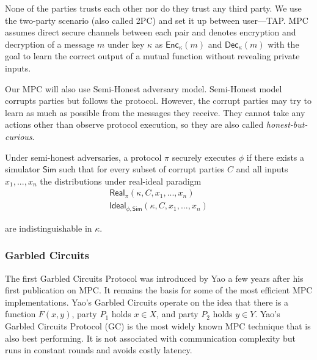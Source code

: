 None of the parties trusts each other nor do they trust any third party. We use the two-party scenario
(also called 2PC) and set it up between user---TAP. MPC assumes direct secure channels between each
pair and denotes encryption and decryption of a message $m$ under key
$\kappa$ as $\mathsf{Enc}_\kappa(m)$ and $\mathsf{Dec}_\kappa(m)$ with the goal to learn the correct
output of a mutual function without revealing private inputs. 

Our MPC will also use Semi-Honest adversary model. Semi-Honest model corrupts parties but follows
the protocol. However, the corrupt parties may try to learn as much as possible from the messages they
receive. They cannot take any actions other than observe protocol execution, so they are also called
\emph{honest-but-curious}. 

Under semi-honest adversaries, a protocol $\pi$ securely executes $\phi$ if there exists a simulator 
$\mathsf{Sim}$ such that for every subset of corrupt parties $C$ and all inputs $x_1, ..., x_n$ the
distributions under real-ideal paradigm 
\begin{gather*}
  \mathsf{Real}_{\pi}(\kappa, C, x_1, ..., x_n) \\
  \mathsf{Ideal}_{\phi, \mathsf{Sim}} (\kappa, C, x_1, ..., x_n)
\end{gather*} 

are indistinguishable in $\kappa$.


\subsubsection{Garbled Circuits}

The first Garbled Circuits Protocol was introduced by Yao a few years after his first publication on MPC. It
remains the basis for some of the most efficient MPC implementations. Yao's Garbled Circuits operate on
the idea that there is a function $F(x,y)$, party $P_1$ holds $x \in X$, and party $P_2$ holds $y \in Y$.
Yao's Garbled Circuits Protocol (GC) is the most widely known MPC technique that is also best
performing. It is not associated with communication complexity but runs in constant rounds and avoids
costly latency. 







